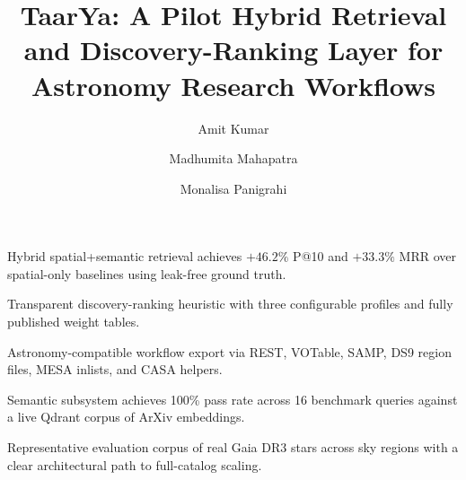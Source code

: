 \documentclass[preprint,12pt,authoryear]{elsarticle}
\begin{document}
\begin{frontmatter}

\title{TaarYa: A Pilot Hybrid Retrieval and Discovery-Ranking Layer for Astronomy Research Workflows}

\author[inst1]{Amit Kumar}

\author[inst1]{Madhumita Mahapatra}

\author[inst1]{Monalisa Panigrahi}


\begin{highlights}
\item Hybrid spatial+semantic retrieval achieves $+46.2\%$ P@10 and $+33.3\%$ MRR over spatial-only baselines using leak-free ground truth.
\item Transparent discovery-ranking heuristic with three configurable profiles and fully published weight tables.
\item Astronomy-compatible workflow export via REST, VOTable, SAMP, DS9 region files, MESA inlists, and CASA helpers.
\item Semantic subsystem achieves 100\% pass rate across 16 benchmark queries against a live Qdrant corpus of \nPapersQdrant{} ArXiv embeddings.
\item Representative evaluation corpus of \nStarsReal{} real Gaia DR3 stars across \nClusterNodes{} sky regions with a clear architectural path to full-catalog scaling.
\end{highlights}


\end{frontmatter}
\end{document}
